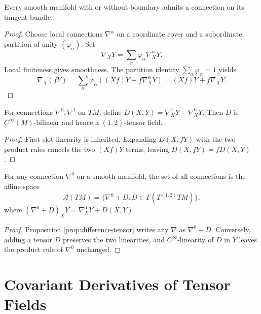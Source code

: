 \begin{proposition}
\label{prop:tangent-bundle-admits-connection}
Every smooth manifold with or without boundary admits a connection on its tangent bundle.
\end{proposition}
\begin{proof}
\sketch Choose local connections $\nabla^\alpha$ on a coordinate cover and a subordinate partition of unity $(\varphi_\alpha)$. Set
\begin{equation}
\nabla_XY=\sum_\alpha\varphi_\alpha\nabla_X^\alpha Y.\tag{4.11}
\end{equation}
Local finiteness gives smoothness. The partition identity $\sum_\alpha\varphi_\alpha=1$ yields
\[
\nabla_X(fY)=\sum_\alpha\varphi_\alpha((Xf)Y+f\nabla_X^\alpha Y)=(Xf)Y+f\nabla_XY.
\]
\end{proof}

\begin{proposition}
\label{prop:difference-tensor}
\leanok
For connections $\nabla^0,\nabla^1$ on $TM$, define $D(X,Y)=\nabla_X^1Y-\nabla_X^0Y$. Then $D$ is $C^\infty(M)$-bilinear and hence a $(1,2)$-tensor field.
\end{proposition}
\begin{proof}
\leanok
\sketch First-slot linearity is inherited. Expanding $D(X,fY)$ with the two product rules cancels the two $(Xf)Y$ terms, leaving $D(X,fY)=fD(X,Y)$.
\end{proof}

\begin{theorem}
\label{thm:connections-affine-space}
\leanok
For any connection $\nabla^0$ on a smooth manifold, the set of all connections is the affine space
\[
\mathcal A(TM)=\{\nabla^0+D:D\in\Gamma(T^{(1,2)}TM)\},
\]
where $(\nabla^0+D)_XY=\nabla^0_XY+D(X,Y)$.
\end{theorem}
\begin{proof}
\leanok
{}
\sketch Proposition \ref{prop:difference-tensor} writes any $\nabla$ as $\nabla^0+D$. Conversely, adding a tensor $D$ preserves the two linearities, and $C^\infty$-linearity of $D$ in $Y$ leaves the product rule of $\nabla^0$ unchanged.
\end{proof}
\section{Covariant Derivatives of Tensor Fields}

